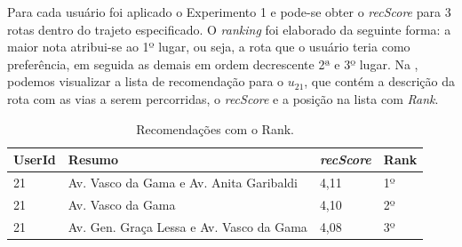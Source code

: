 \documentclass[portuguese]{textolivre}
\begin{document}


Para cada usuário foi aplicado o Experimento 1 e pode-se obter o \textit{recScore} para 3 rotas dentro do trajeto especificado. O \textit{ranking} foi elaborado da seguinte forma: a maior nota atribui-se ao 1º lugar, ou seja, a rota que o usuário teria como preferência, em seguida as demais em ordem decrescente 2ª e 3º lugar.
Na , podemos visualizar a lista de recomendação para o $u_{21}$, que contém a descrição da rota com as vias a serem percorridas, o \textit{recScore} e a posição na lista com \textit{Rank}.

\begin{table}[htpb]
\centering
\begin{threeparttable}
\caption{Recomendações com o Rank.}
\label{tab:table6}
\begin{tabular}{llll} 
\toprule 
UserId & Resumo  & \textit{recScore} & Rank\\
\midrule
21  & Av. Vasco da Gama e Av. Anita Garibaldi &  4,11 & 1º  \\
21 & Av. Vasco da Gama & 4,10 & 2º \\
21 & Av. Gen. Graça Lessa e Av. Vasco da Gama & 4,08 & 3º \\
\bottomrule
\end{tabular}
\end{threeparttable}
\end{table}
\end{document}
